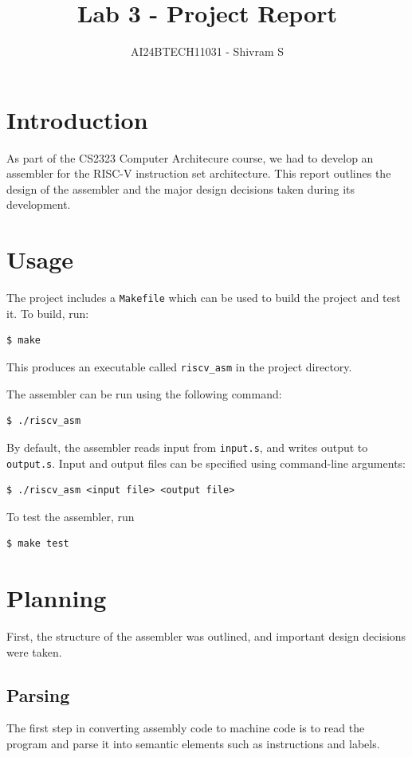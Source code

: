 \documentclass{article}
\title{Lab 3 - Project Report}
\author{AI24BTECH11031 - Shivram S}
\date{}
\begin{document}
\maketitle
\tableofcontents
\pagebreak


\section{Introduction}

As part of the CS2323 Computer Architecure course, we had to develop an assembler
for the RISC-V instruction set architecture. This report outlines the design of the 
assembler and the major design decisions taken during its development.

\section{Usage}

The project includes a \texttt{Makefile} which can be used to build the project and
test it. To build, run:
\begin{verbatim}
$ make
\end{verbatim} 
This produces an executable called \texttt{riscv\_asm} in the project directory.

The assembler can be run using the following command:
\begin{verbatim}
$ ./riscv_asm
\end{verbatim}
By default, the assembler reads input from \texttt{input.s}, and writes output
to \texttt{output.s}. Input and output files can be specified using command-line
arguments:
\begin{verbatim}
$ ./riscv_asm <input file> <output file>
\end{verbatim}
To test the assembler, run
\begin{verbatim}
$ make test
\end{verbatim}


\section{Planning}

First, the structure of the assembler was outlined, and important design decisions
were taken.


\subsection{Parsing}

The first step in converting assembly code to machine code is to read the program
and parse it into semantic elements such as instructions and labels.
\end{document}
